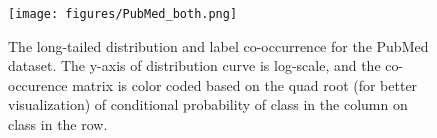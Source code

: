 \documentclass[11pt]{article}
\begin{document}
\begin{figure}[t]\centering
    \texttt{[image: figures/PubMed\_both.png]}
    \caption{The long-tailed distribution and label co-occurrence for the PubMed dataset. 
The y-axis of distribution curve is log-scale, and the co-occurence matrix is color coded based on the quad root (for better visualization) of conditional probability  of class in the  column on class in the  row.}\label{fig:longtailed_pubmed}\end{figure}

\begin{comment}
\begin{figure}[t]\centering
    \texttt{[image: figures/PubMed\_label\_distribution.pdf]}
    \texttt{[image: figures/PubMed\_label\_cooccurence.png]}
    \caption{The long-tailed distribution and label co-occurrence for the PubMed dataset. 
The y-axis of distribution curve is log-scale, and the co-occurence matrix is color coded based on the quad root (for better visualization) of conditional probability  of class in the  column on class in the  row.}\label{fig:longtailed_pubmed}\end{figure}
\end{comment}
\end{document}
